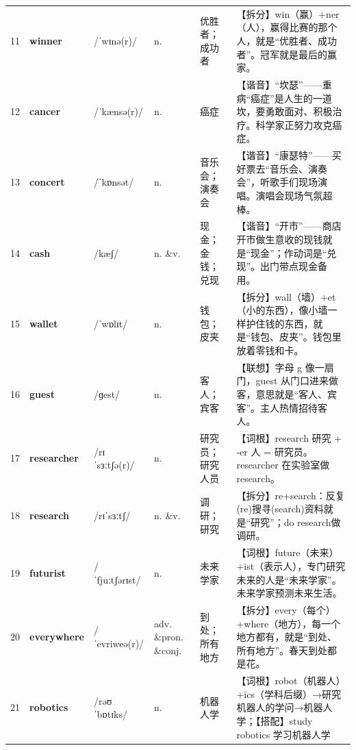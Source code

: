 \documentclass[UTF8,a4paper,11pt,oneside]{ctexbook}
\newcommand{\cellword}[1]{{\bfseries\textcolor{wordcol}{#1}}}
\newcommand{\cellipa}[1]{{\footnotesize\textcolor{ipacol}{#1}}}
\newcommand{\cellpos}[1]{\textcolor{poscol}{#1}}
\newcommand{\cellno}[1]{\textcolor{volcolor!75!black}{#1}}
\begin{document}
{\begin{longtable}{@{}C{0.045\textwidth}L{0.155\textwidth}L{0.175\textwidth}C{0.070\textwidth}L{0.180\textwidth}L{0.282\textwidth}@{}}
 \cellno{11} & \cellword{winner} & \cellipa{/ˈwɪnə(r)/} & \cellpos{n.} & 优胜者；成功者 & \textcolor{tagSplit}{【拆分】}win（赢）+ner（人），赢得比赛的那个人，就是“优胜者、成功者”。冠军就是最后的赢家。 \\
\cellno{12} & \cellword{cancer} & \cellipa{/ˈkænsə(r)/} & \cellpos{n.} & 癌症 & \textcolor{tagSound}{【谐音】}“坎瑟”——重病“癌症”是人生的一道坎，要勇敢面对、积极治疗。科学家正努力攻克癌症。 \\
 \cellno{13} & \cellword{concert} & \cellipa{/ˈkɒnsət/} & \cellpos{n.} & 音乐会；演奏会 & \textcolor{tagSound}{【谐音】}“康瑟特”——买好票去“音乐会、演奏会”，听歌手们现场演唱。演唱会现场气氛超棒。 \\
\cellno{14} & \cellword{cash} & \cellipa{/kæʃ/} & \cellpos{n. \&v.} & 现金；金钱；兑现 & \textcolor{tagSound}{【谐音】}“开市”——商店开市做生意收的现钱就是“现金”；作动词是“兑现”。出门带点现金备用。 \\
 \cellno{15} & \cellword{wallet} & \cellipa{/ˈwɒlɪt/} & \cellpos{n.} & 钱包；皮夹 & \textcolor{tagSplit}{【拆分】}wall（墙）+et（小的东西），像小墙一样护住钱的东西，就是“钱包、皮夹”。钱包里放着零钱和卡。 \\
\cellno{16} & \cellword{guest} & \cellipa{/ɡest/} & \cellpos{n.} & 客人；宾客 & \textcolor{tagAssoc}{【联想】}字母 g 像一扇门，guest 从门口进来做客，意思就是“客人、宾客”。主人热情招待客人。 \\
 \cellno{17} & \cellword{researcher} & \cellipa{/rɪˈsɜːtʃə(r)/} & \cellpos{n.} & 研究员；研究人员 & \textcolor{tagRoot}{【词根】}research 研究 + -er 人 = 研究员。researcher 在实验室做 research。 \\
\cellno{18} & \cellword{research} & \cellipa{/rɪˈsɜːtʃ/} & \cellpos{n. \&v.} & 调研；研究 & \textcolor{tagSplit}{【拆分】}re+search：反复(re)搜寻(search)资料就是“研究”；do research做调研。 \\
 \cellno{19} & \cellword{futurist} & \cellipa{/ˈfjuːtʃərɪst/} & \cellpos{n.} & 未来学家 & \textcolor{tagRoot}{【词根】}future（未来）+ist（表示人），专门研究未来的人是“未来学家”。未来学家预测未来生活。 \\
\cellno{20} & \cellword{everywhere} & \cellipa{/ˈevriweə(r)/} & \cellpos{adv. \&pron. \&conj.} & 到处；所有地方 & \textcolor{tagSplit}{【拆分】}every（每个）+where（地方），每一个地方都有，就是“到处、所有地方”。春天到处都是花。 \\
 \cellno{21} & \cellword{robotics} & \cellipa{/rəʊˈbɒtɪks/} & \cellpos{n.} & 机器人学 & \textcolor{tagRoot}{【词根】}robot（机器人）+ics（学科后缀）→\allowbreak{}研究机器人的学问→\allowbreak{}机器人学；\textcolor{tagColloc}{【搭配】}study robotics 学习机器人学 \\

\end{longtable}}
\end{document}
